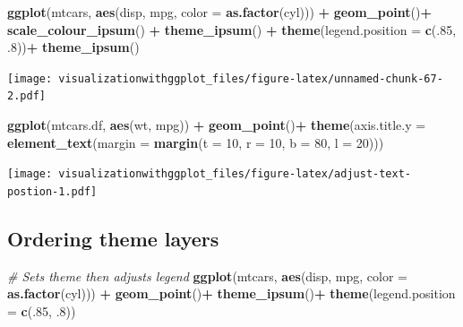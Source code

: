 \documentclass[]{krantz}
\makeatletter
\newenvironment{Shaded}{\begin{snugshade}}{\end{snugshade}}
\newcommand{\KeywordTok}[1]{\textcolor[rgb]{0.13,0.29,0.53}{\textbf{#1}}}
\newcommand{\DataTypeTok}[1]{\textcolor[rgb]{0.13,0.29,0.53}{#1}}
\newcommand{\DecValTok}[1]{\textcolor[rgb]{0.00,0.00,0.81}{#1}}
\newcommand{\StringTok}[1]{\textcolor[rgb]{0.31,0.60,0.02}{#1}}
\newcommand{\CommentTok}[1]{\textcolor[rgb]{0.56,0.35,0.01}{\textit{#1}}}
\newcommand{\OperatorTok}[1]{\textcolor[rgb]{0.81,0.36,0.00}{\textbf{#1}}}
\newcommand{\NormalTok}[1]{#1}
\newenvironment{kframe}{%
\medskip{}
\setlength{\fboxsep}{.8em}
 \def\at@end@of@kframe{}%
 \ifinner\ifhmode%
  \def\at@end@of@kframe{\end{minipage}}%
  \begin{minipage}{\columnwidth}%
 \fi\fi%
 \def\FrameCommand##1{\hskip\@totalleftmargin \hskip-\fboxsep
 \colorbox{shadecolor}{##1}\hskip-\fboxsep
     \hskip-\linewidth \hskip-\@totalleftmargin \hskip\columnwidth}%
 \MakeFramed {\advance\hsize-\width
   \@totalleftmargin\z@ \linewidth\hsize
   \@setminipage}}%
 {\par\unskip\endMakeFramed%
 \at@end@of@kframe}
\renewenvironment{Shaded}{\begin{kframe}}{\end{kframe}}
\theoremstyle{definition}
\theoremstyle{definition}
\theoremstyle{definition}
\theoremstyle{remark}
\makeatother
\begin{document}
\begin{Shaded}
\begin{Highlighting}[]
\KeywordTok{ggplot}\NormalTok{(mtcars, }\KeywordTok{aes}\NormalTok{(disp, mpg, }\DataTypeTok{color =} \KeywordTok{as.factor}\NormalTok{(cyl))) }\OperatorTok{+}\StringTok{ }\KeywordTok{geom_point}\NormalTok{()}\OperatorTok{+}\StringTok{  }\KeywordTok{scale_colour_ipsum}\NormalTok{() }\OperatorTok{+}\StringTok{ }
\KeywordTok{theme_ipsum}\NormalTok{() }\OperatorTok{+}
\KeywordTok{theme}\NormalTok{(}\DataTypeTok{legend.position =} \KeywordTok{c}\NormalTok{(.}\DecValTok{85}\NormalTok{, .}\DecValTok{8}\NormalTok{))}\OperatorTok{+}\StringTok{  }
\KeywordTok{theme_ipsum}\NormalTok{()}
\end{Highlighting}
\end{Shaded}

\texttt{[image: visualizationwithggplot\_files/figure-latex/unnamed-chunk-67-2.pdf]}

\begin{Shaded}
\begin{Highlighting}[]
\KeywordTok{ggplot}\NormalTok{(mtcars.df, }\KeywordTok{aes}\NormalTok{(wt, mpg)) }\OperatorTok{+}\StringTok{ }
\StringTok{  }\KeywordTok{geom_point}\NormalTok{()}\OperatorTok{+}
\StringTok{  }\KeywordTok{theme}\NormalTok{(}\DataTypeTok{axis.title.y =} \KeywordTok{element_text}\NormalTok{(}\DataTypeTok{margin =} \KeywordTok{margin}\NormalTok{(}\DataTypeTok{t =} \DecValTok{10}\NormalTok{, }\DataTypeTok{r =} \DecValTok{10}\NormalTok{, }\DataTypeTok{b =} \DecValTok{80}\NormalTok{, }\DataTypeTok{l =} \DecValTok{20}\NormalTok{)))}
\end{Highlighting}
\end{Shaded}

\texttt{[image: visualizationwithggplot\_files/figure-latex/adjust-text-postion-1.pdf]}

\subsection{Ordering theme layers}\label{ordering-theme-layers}

\begin{Shaded}
\begin{Highlighting}[]
\CommentTok{# Sets theme then adjusts legend}
\KeywordTok{ggplot}\NormalTok{(mtcars, }\KeywordTok{aes}\NormalTok{(disp,  mpg, }\DataTypeTok{color =} \KeywordTok{as.factor}\NormalTok{(cyl))) }\OperatorTok{+}\StringTok{ }\KeywordTok{geom_point}\NormalTok{()}\OperatorTok{+}\StringTok{ }
\StringTok{  }\KeywordTok{theme_ipsum}\NormalTok{()}\OperatorTok{+}
\StringTok{  }\KeywordTok{theme}\NormalTok{(}\DataTypeTok{legend.position =} \KeywordTok{c}\NormalTok{(.}\DecValTok{85}\NormalTok{, .}\DecValTok{8}\NormalTok{))}
\end{Highlighting}
\end{Shaded}
\end{document}
